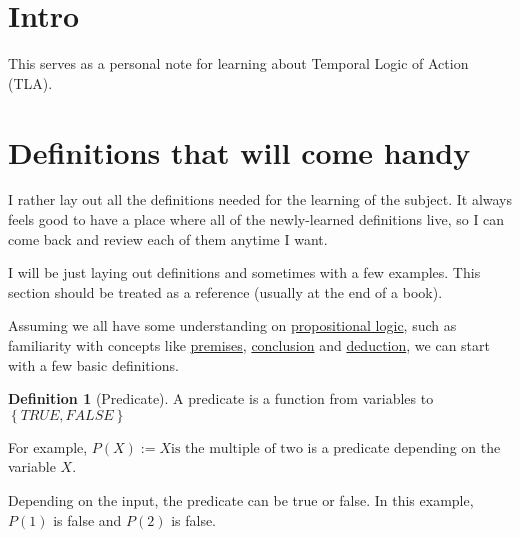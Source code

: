 \documentclass{article}
\theoremstyle{definition}
\newtheorem{definition}{Definition}[section]
\theoremstyle{remark}
\begin{document}
\section*{Intro}

This serves as a personal note for learning about Temporal Logic of Action (TLA).

\section*{Definitions that will come handy}
I rather lay out all the definitions needed for the learning of the subject. It always feels good to have a place where all of the newly-learned definitions live, so I can come back and review each of them anytime I want.

I will be just laying out definitions and sometimes with a few examples. This section should be treated as a reference (usually at the end of a book).

Assuming we all have some understanding on \underline{propositional logic}, such as familiarity with concepts like \underline{premises}, \underline{conclusion} and \underline{deduction}, we can start with a few basic definitions.

\begin{definition}[Predicate]

A predicate is a function from variables to $\left\{TRUE, FALSE\right\}$

For example, $P(X) := X \text{is the multiple of two}$ is a predicate depending on the variable $X$. 

Depending on the input, the predicate can be true or false. In this example, $P(1)$ is false and $P(2)$ is false.


\end{definition}
\end{document}
